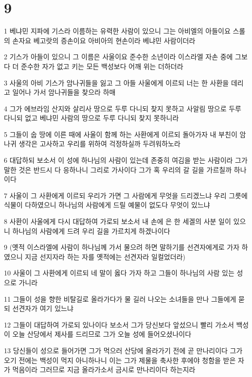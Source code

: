 \chapter{9}

\par 1 베냐민 지파에 기스라 이름하는 유력한 사람이 있으니 그는 아비엘의 아들이요 스롤의 손자요 베고랏의 증손이요 아비아의 현손이라 베냐민 사람이더라
\par 2 기스가 아들이 있으니 그 이름은 사울이요 준수한 소년이라 이스라엘 자손 중에 그보다 더 준수한 자가 없고 키는 모든 백성보다 어깨 위는 더하더라
\par 3 사울의 아비 기스가 암나귀들을 잃고 그 아들 사울에게 이르되 너는 한 사환을 데리고 일어나 가서 암나귀들을 찾으라 하매
\par 4 그가 에브라임 산지와 살리사 땅으로 두루 다니되 찾지 못하고 사알림 땅으로 두루 다니되 없고 베냐민 사람의 땅으로 두루 다니되 찾지 못하니라
\par 5 그들이 숩 땅에 이른 때에 사울이 함께 하는 사환에게 이르되 돌아가자 내 부친이 암나귀 생각은 고사하고 우리를 위하여 걱정하실까 두려워하노라
\par 6 대답하되 보소서 이 성에 하나님의 사람이 있는데 존중히 여김을 받는 사람이라 그가 말한 것은 반드시 다 응하나니 그리로 가사이다 그가 혹 우리의 갈 길을 가르칠까 하나이다
\par 7 사울이 그 사환에게 이르되 우리가 가면 그 사람에게 무엇을 드리겠느냐 우리 그릇에 식물이 다하였으니 하나님의 사람에게 드릴 예물이 없도다 무엇이 있느냐
\par 8 사환이 사울에게 다시 대답하여 가로되 보소서 내 손에 은 한 세겔의 사분 일이 있으니 하나님의 사람에게 드려 우리 길을 가르치게 하겠나이다
\par 9 (옛적 이스라엘에 사람이 하나님께 가서 물으려 하면 말하기를 선견자에게로 가자 하였으니 지금 선지자라 하는 자를 옛적에는 선견자라 일컬었더라)
\par 10 사울이 그 사환에게 이르되 네 말이 옳다 가자 하고 그들이 하나님의 사람 있는 성으로 가니라
\par 11 그들이 성을 향한 비탈길로 올라가다가 물 길러 나오는 소녀들을 만나 그들에게 묻되 선견자가 여기 있느냐
\par 12 그들이 대답하여 가로되 있나이다 보소서 그가 당신보다 앞섰으니 빨리 가소서 백성이 오늘 산당에서 제사를 드리므로 그가 오늘 성에 들어오셨나이다
\par 13 당신들이 성으로 들어가면 그가 먹으러 산당에 올라가기 전에 곧 만나리이다 그가 오기 전에는 백성이 먹지 아니하나니 이는 그가 제물을 축사한 후에야 청함을 받은 자가 먹음이라 그러므로 지금 올라가소서 금시로 만나리이다 하는지라

